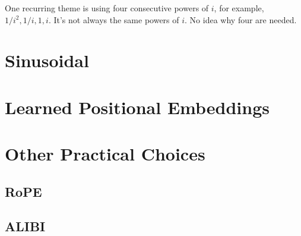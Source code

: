 One recurring theme is using four consecutive powers of $i$, for example, $1/i^2, 1/i, 1, i$. It's not always the same powers of $i$. No idea why four are needed.

\section{Sinusoidal}


\section{Learned Positional Embeddings}


\section{Other Practical Choices}

\subsection{RoPE}

\subsection{ALIBI}